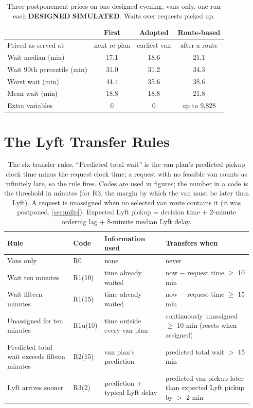 \documentclass{article}
\newcommand{\lab}[1]{{\footnotesize\textsf{\textbf{#1}}}}
\newcommand{\DES}{\lab{DESIGNED}}
\newcommand{\SIM}{\lab{SIMULATED}}
\begin{document}
\begin{table}[t]
\centering\small
\caption{Three postponement prices on one designed evening, vans only, one run each \DES{} \SIM. Waits over requests picked up.}\label{tab:pending}
\begin{tabularx}{\columnwidth}{@{}Lccc@{}}
\toprule
 & \textbf{First} & \textbf{Adopted} & \textbf{Route-based}\\
\midrule
Priced as served at & next re-plan & earliest van & after a route\\
Wait median (min) & 17.1 & 18.6 & 21.1\\
Wait 90th percentile (min) & 31.0 & 31.2 & 34.3\\
Worst wait (min) & 44.4 & 35.6 & 38.6\\
Mean wait (min) & 18.8 & 18.8 & 21.8\\
Extra variables & 0 & 0 & up to 9,828\\
\bottomrule
\end{tabularx}
\end{table}

\section{The Lyft Transfer Rules}\label{sec:rules}

\begin{table}[t]
\centering\small
\caption{The six transfer rules. ``Predicted total wait'' is the van plan's predicted pickup clock time minus the request clock time; a request with no feasible van counts as infinitely late, so the rule fires. Codes are used in figures; the number in a code is the threshold in minutes (for R3, the margin by which the van must be later than Lyft). A request is unassigned when no selected van route contains it (it was postponed, \cref{sec:milp}). Expected Lyft pickup = decision time + 2-minute ordering lag + 8-minute median Lyft delay.}\label{tab:rules}
\begin{tabularx}{\textwidth}{@{}P{4.6cm}P{1.3cm}P{3.6cm}L@{}}
\toprule
\textbf{Rule} & \textbf{Code} & \textbf{Information used} & \textbf{Transfers when}\\
\midrule
Vans only & R0 & none & never\\
Wait ten minutes & R1(10) & time already waited & now $-$ request time $\ge$ 10 min\\
Wait fifteen minutes & R1(15) & time already waited & now $-$ request time $\ge$ 15 min\\
Unassigned for ten minutes & R1u(10) & time outside every van plan & continuously unassigned $\ge$ 10 min (resets when assigned)\\
Predicted total wait exceeds fifteen minutes & R2(15) & van plan's prediction & predicted total wait $>$ 15 min\\
Lyft arrives sooner & R3(2) & prediction + typical Lyft delay & predicted van pickup later than expected Lyft pickup by $>$ 2 min\\
\bottomrule
\end{tabularx}
\end{table}
\end{document}
